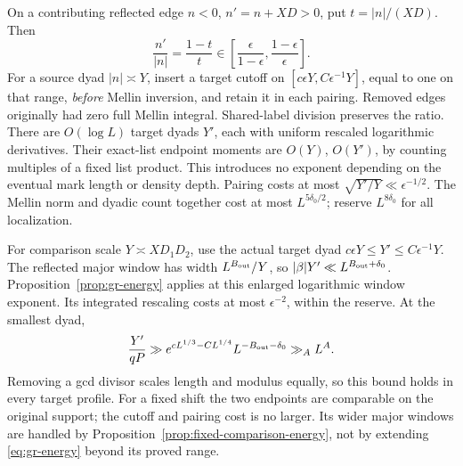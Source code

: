 On a contributing reflected edge \(n<0\), \(n'=n+XD>0\),
put \(t=|n|/(XD)\). Then
\begin{equation}\label{eq:two-sided-localization}
 \frac{n'}{|n|}=\frac{1-t}{t}
 \in\left[\frac\epsilon{1-\epsilon},
                \frac{1-\epsilon}{\epsilon}\right].
\end{equation}
For a source dyad \(|n|\asymp Y\), insert a target cutoff on
\([c\epsilon Y,C\epsilon^{-1}Y]\), equal to one on that range,
\emph{before} Mellin inversion, and retain it in each pairing.
Removed edges originally had zero full Mellin integral.
Shared-label division preserves the ratio. There are \(O(\log L)\)
target dyads \(Y'\), each with uniform rescaled logarithmic derivatives.
Their exact-list endpoint moments are \(O(Y)\), \(O(Y')\), by
counting multiples of a fixed list product. This introduces no
exponent depending on the eventual mark length or density depth.
Pairing costs at most \(\sqrt{Y'/Y}\ll\epsilon^{-1/2}\).
The Mellin norm and dyadic count together cost at most
\(L^{5\delta_0/2}\); reserve \(L^{8\delta_0}\) for all localization.

For comparison scale \(Y\asymp XD_1D_2\), use the actual target
dyad \(c\epsilon Y\le Y'\le C\epsilon^{-1}Y\).
The reflected major window has width \(L^{B_{\rm out}}/Y\), so
\(|\beta|Y'\ll L^{B_{\rm out}+\delta_0}\).
Proposition~\ref{prop:gr-energy} applies at this enlarged logarithmic
window exponent. Its integrated rescaling costs at most
\(\epsilon^{-2}\), within the reserve. At the smallest dyad,
\begin{equation}\label{eq:smallest-dyad}
 \frac{Y'}{qP}\gg
 e^{cL^{1/3}-CL^{1/4}}L^{-B_{\rm out}-\delta_0}\gg_A L^A.
\end{equation}
Removing a gcd divisor scales length and modulus equally, so this
bound holds in every target profile.
For a fixed shift the two endpoints are comparable on the original
support; the cutoff and pairing cost is no larger. Its wider major
windows are handled by Proposition~\ref{prop:fixed-comparison-energy},
not by extending \eqref{eq:gr-energy} beyond its proved range.

